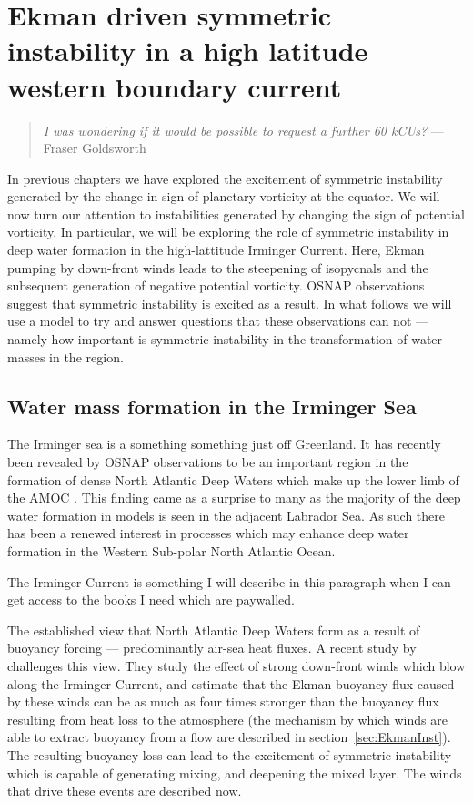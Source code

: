 \chapter{Ekman driven symmetric instability in a high latitude western boundary current}
\label{chap:5}
\begin{quote}
    \textit{I was wondering if it would be possible to request a further 60 kCUs?} --- Fraser Goldsworth
\end{quote}

In previous chapters we have explored the excitement of symmetric instability generated by the change in sign of planetary vorticity at the equator. We will now turn our attention to instabilities generated by changing the sign of potential vorticity. In particular, we will be exploring the role of symmetric instability in deep water formation in the high-lattitude Irminger Current. Here, Ekman pumping by down-front winds leads to the steepening of isopycnals and the subsequent generation of negative potential vorticity. OSNAP observations suggest that symmetric instability is excited as a result. In what follows we will use a model to try and answer questions that these observations can not --- namely how important is symmetric instability in the transformation of water masses in the region.

\section{Water mass formation in the Irminger Sea}
The Irminger sea is a something something just off Greenland.
It has recently been revealed by OSNAP observations to be an important region in the formation of dense North Atlantic Deep Waters which make up the lower limb of the AMOC \citet{Lozier2019}. This finding came as a surprise to many as the majority of the deep water formation in models is seen in the adjacent Labrador Sea. As such there has been a renewed interest in processes which may enhance deep water formation in the Western Sub-polar North Atlantic Ocean.

The Irminger Current is something I will describe in this paragraph when I can get access to the books I need which are paywalled.

The established view that North Atlantic Deep Waters form as a result of buoyancy forcing --- predominantly air-sea heat fluxes. A recent study by \citet{LeBras2022} challenges this view. They study the effect of strong down-front winds which blow along the Irminger Current, and estimate that the Ekman buoyancy flux caused by these winds can be as much as four times stronger than the buoyancy flux resulting from heat loss to the atmosphere (the mechanism by which winds are able to extract buoyancy from a flow are described in section~\ref{sec:EkmanInst}). The resulting buoyancy loss can lead to the excitement of symmetric instability which is capable of generating mixing, and deepening the mixed layer. The winds that drive these events are described now.

